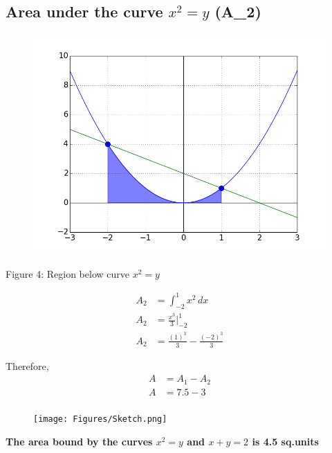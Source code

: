 \documentclass[journal,12pt,twocolumn]{IEEEtran}
\begin{document}
\subsection{\textbf{Area under the curve $x^2 = y$ (A_2)}}
\begin{figure}[H]
    \centering
    \includegraphics[width=\columnwidth]{Figures/x^2.png}
\end{figure}
\begin{center}
    Figure 4: Region below curve $x^2 = y$
\end{center}
\begin{align}
    A_2 &= \int_{-2}^{1} x^2 \, dx\\
    A_2 &= \frac{x^3}{3}\Biggr|_{-2}^{1}\\
    A_2 &= \frac{(1)^3}{3} - \frac{(-2)^3}{3}
\end{align}
\begin{center}
\end{center}    
Therefore,
\begin{align}
    A &= A_1 - A_2\\
    A &= 7.5 - 3\\
\end{align}
\begin{center}
    \textbf{}
\end{center}
\begin{figure}[H]
    \centering
    \texttt{[image: Figures/Sketch.png]}
\end{figure}
\begin{center}
\textbf{The area bound by the curves $x^2 = y$ and $x + y = 2$ is 4.5 sq.units}
\end{center}
\end{document}
